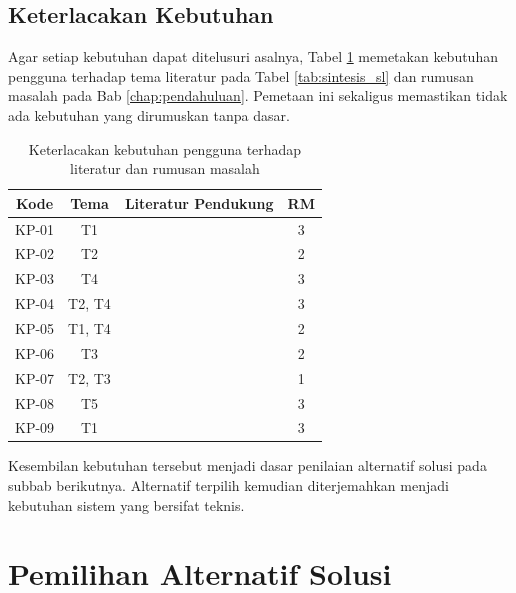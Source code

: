 \subsection{Keterlacakan Kebutuhan}
\label{keterlacakan}

Agar setiap kebutuhan dapat ditelusuri asalnya, Tabel \ref{tab:keterlacakan} memetakan kebutuhan pengguna terhadap tema literatur pada Tabel \ref{tab:sintesis_sl} dan rumusan masalah pada Bab \ref{chap:pendahuluan}. Pemetaan ini sekaligus memastikan tidak ada kebutuhan yang dirumuskan tanpa dasar.

\begin{table}[t]
  \centering
  \small
  \caption{Keterlacakan kebutuhan pengguna terhadap literatur dan rumusan masalah}
  \label{tab:keterlacakan}
  \renewcommand{\arraystretch}{1.2}
  \begin{tabularx}{\textwidth}{| c | c | X | c |}
    \hline
    \textbf{Kode} & \textbf{Tema} & \textbf{Literatur Pendukung} & \textbf{RM} \\
    \hline
    KP-01 & T1 & \autocite{mcafee2023impostor, mai2023warning, SIP_Law_Firm_2025} & 3 \\
    KP-02 & T2 & \autocite{liu2023asvspoof2021} & 2 \\
    KP-03 & T4 & \autocite{amershi2019guidelines} & 3 \\
    KP-04 & T2, T4 & \autocite{Iman_2026, muller2022generalize, guo2017calibration} & 3 \\
    KP-05 & T1, T4 & \autocite{mcafee2023impostor, nielsen1993response} & 2 \\
    KP-06 & T3 & \autocite{muller2022generalize} & 2 \\
    KP-07 & T2, T3 & \autocite{almutairi2022review, muller2021silence} & 1 \\
    KP-08 & T5 & \autocite{nautsch2019privacy, uupdp2022} & 3 \\
    KP-09 & T1 & \autocite{Iman_2026, SIP_Law_Firm_2025} & 3 \\
    \hline
  \end{tabularx}
\end{table}

Kesembilan kebutuhan tersebut menjadi dasar penilaian alternatif solusi pada subbab berikutnya. Alternatif terpilih kemudian diterjemahkan menjadi kebutuhan sistem yang bersifat teknis.

\section{Pemilihan Alternatif Solusi}
\label{alt_solusi}

